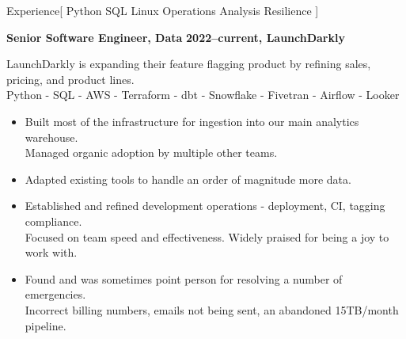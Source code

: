 \documentclass[11pt,a4paper]{article}
\begin{document}
\sloppy  %


\vspace{1em}

\begin{mysection}{Experience}[
    Python
    \textbullet{} SQL
    \textbullet{} Linux
    \textbullet{} Operations
    \textbullet{} Analysis
    \textbullet{} Resilience
]

  \begin{addmargin}[0.5em]{0em}
    {\large\bfseries Senior Software Engineer, Data}%
    \hfill {\bfseries 2022--current, LaunchDarkly}%
    \begin{adjustwidth}{1ex}{0ex}
      LaunchDarkly is expanding their feature flagging product by
      refining sales, pricing, and product lines.\\
      Python - SQL - AWS - Terraform - dbt - Snowflake - Fivetran - Airflow
      - Looker

      \begin{itemize}
          [label=-, topsep=0pt, itemsep=0.5ex, parsep=0pt, leftmargin=1em]

      \item Built most of the infrastructure for ingestion into our main
            analytics warehouse.
      \\    Managed organic adoption by multiple other teams.

      \item Adapted existing tools to handle an order of magnitude more data.

      \item Established and refined development operations - deployment, CI,
            tagging compliance.
      \\    Focused on team speed and effectiveness.
            Widely praised for being a joy to work with.

      \item Found and was sometimes point person for resolving a number of
            emergencies.
      \\    Incorrect billing numbers, emails not being sent,
            an abandoned 15TB/month pipeline.

      \end{itemize}

    \end{adjustwidth}
  \end{addmargin}
  \medskip



\end{mysection}
\end{document}
